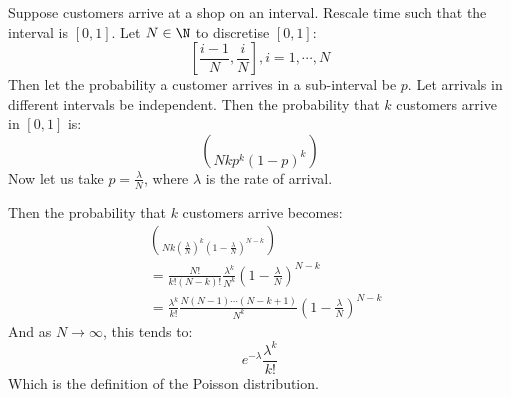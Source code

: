 \documentclass[../Main.tex]{subfiles}
\begin{document}
\begin{example}
    Suppose customers arrive at a shop on an interval. Rescale time such that the interval is $[0, 1]$. Let $N \in \N$ to discretise $[0, 1]$:
        \begin{equation*}
            \left[\frac{i-1}{N}, \frac{i}{N}\right], i = 1, \cdots, N
        \end{equation*}
        Then let the probability a customer arrives in a sub-interval be $p$. Let arrivals in different intervals be independent. Then the probability that $k$ customers arrive in $[0, 1]$ is:
        \begin{equation*}
            \choose{N}{k}p^k(1-p)^k
        \end{equation*}
        Now let us take $p = \frac{\lambda}{N}$, where $\lambda$ is the rate of arrival.\par
        Then the probability that $k$ customers arrive becomes:
        \begin{align*}
            &\choose{N}{k} \left(\frac{\lambda}{N}\right)^k \left(1-\frac{\lambda}{N}\right)^{N-k} \\
            &= \frac{N!}{k!(N-k)!} \frac{\lambda^k}{N^k}\left(1-\frac{\lambda}{N}\right)^{N-k} \\
            &= \frac{\lambda^k}{k!} \frac{N(N-1)\cdots(N-k+1)}{N^k}\left(1-\frac{\lambda}{N}\right)^{N-k}
        \end{align*}
        And as $N \to \infty$, this tends to:
        \begin{equation*}
            e^{-\lambda} \frac{\lambda^k}{k!}
        \end{equation*}
        Which is the definition of the Poisson distribution.
\end{example}
\end{document}
